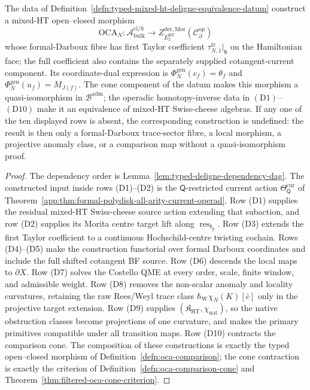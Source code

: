 \begin{prop}
\label{prop:typed-mixed-ht-deligne-equivalence-datum}
The data of Definition~\ref{defn:typed-mixed-ht-deligne-equivalence-datum}
construct a mixed-HT open--closed morphism
\[
  \mathrm{OCA}_N\colon
  \mathcal A^{\mathrm{cl}/\hbar}_{\mathrm{bulk}}
  \longrightarrow
  Z^{\mathrm{der},\mathrm{Mor}}_{E_2^{\mathrm{HT}}}
  (\mathcal C^{\mathrm{op}}_\partial)
\]
whose formal-Darboux fibre has first Taylor coefficient
\(\tau_{N,1}^{\mathrm{tr}}|_{\mathfrak h}\) on the Hamiltonian face;
the full coefficient also contains the separately supplied
cotangent-current component.  Its coordinate-dual expression is
\(\Phi_N^{\mathrm{gen}}(c_f)=\theta_f\) and
\(\Phi_N^{\mathrm{gen}}(u_f)=M_{J(f)}\).  The cone component of the
datum makes this morphism a quasi-isomorphism in
\(\mathcal B^{\mathrm{adm}}\); the operadic homotopy-inverse data in
\((\mathrm{D1})\)--\((\mathrm{D10})\) make it an equivalence of
mixed-HT Swiss-cheese algebras.  If any one of the ten displayed rows is
absent, the corresponding construction is undefined: the result is then
only a formal-Darboux trace-sector fibre, a local morphism, a projective
anomaly class, or a comparison map without a quasi-isomorphism proof.
\end{prop}

\begin{proof}
The dependency order is Lemma~\ref{lem:typed-deligne-dependency-dag}.
The constructed input inside rows \textup{(D1)}--\textup{(D2)} is the
\(\mathsf Q\)-restricted current action
\(\Theta_{\mathsf Q}^{\mathrm{cur}}\) of
Theorem~\ref{app:thm:formal-polydisk-all-arity-current-operad}.  Row
\textup{(D1)} supplies the residual mixed-HT Swiss-cheese source action
extending that subaction, and row \textup{(D2)} supplies its Morita centre
target lift along \(\operatorname{res}_{b_p}\).  Row
\textup{(D3)} extends the first Taylor coefficient to a continuous
Hochschild-centre twisting cochain.  Rows \textup{(D4)}--\textup{(D5)} make the construction
functorial over formal Darboux coordinates and include the full shifted
cotangent BF source.  Row \textup{(D6)} descends the local maps to
\(\partial X\).  Row \textup{(D7)} solves the Costello QME at every
  order, scale, finite window, and admissible weight.  Row \textup{(D8)}
  removes the non-scalar anomaly and locality curvatures, retaining the
  raw Rees/Weyl trace class
  \(\hbar_{\mathrm W}\chi_N(K)[\bar c]\) only in the projective target
  extension.  Row \textup{(D9)} supplies
  \((\mathfrak K_{\mathrm{HT}},\chi_{\mathrm{nat}})\), so the native
  obstruction classes become projections of one curvature, and makes the
  primary primitives compatible under all transition maps.  Row
\textup{(D10)} contracts the comparison cone.  The composition of these
constructions is exactly the typed open--closed morphism of
Definition~\ref{defn:oca-comparison}; the cone contraction is exactly the
criterion of Definition~\ref{defn:oca-comparison-cone} and
Theorem~\ref{thm:filtered-oca-cone-criterion}.
\end{proof}

